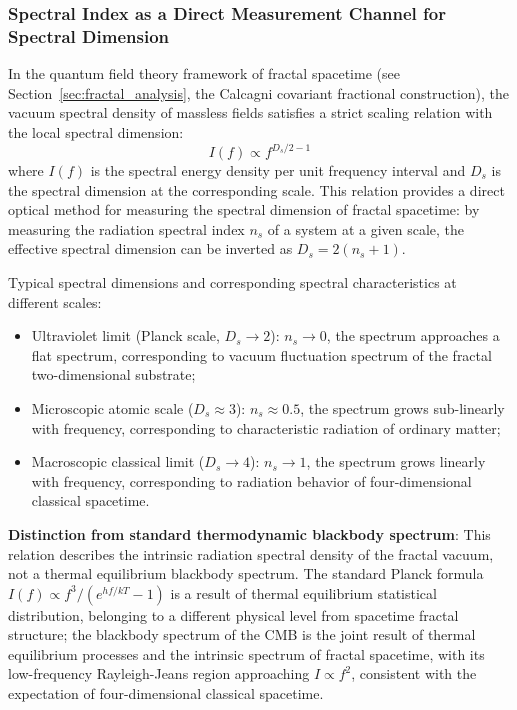 \documentclass[12pt,a4paper,twocolumn]{article}
\begin{document}
\subsubsection{Spectral Index as a Direct Measurement Channel for Spectral Dimension}
\label{subsec:spectral_index_measurement}
In the quantum field theory framework of fractal spacetime (see Section~\ref{sec:fractal_analysis}, the Calcagni covariant fractional construction), the vacuum spectral density of massless fields satisfies a strict scaling relation with the local spectral dimension:
\begin{equation}
I(f) \propto f^{D_s / 2 - 1}
\end{equation}
where $I(f)$ is the spectral energy density per unit frequency interval and $D_s$ is the spectral dimension at the corresponding scale. This relation provides a direct optical method for measuring the spectral dimension of fractal spacetime: by measuring the radiation spectral index $n_s$ of a system at a given scale, the effective spectral dimension can be inverted as $D_s = 2(n_s + 1)$.

Typical spectral dimensions and corresponding spectral characteristics at different scales:
\begin{itemize}
\item Ultraviolet limit (Planck scale, $D_s \to 2$): $n_s \to 0$, the spectrum approaches a flat spectrum, corresponding to vacuum fluctuation spectrum of the fractal two-dimensional substrate;
\item Microscopic atomic scale ($D_s \approx 3$): $n_s \approx 0.5$, the spectrum grows sub-linearly with frequency, corresponding to characteristic radiation of ordinary matter;
\item Macroscopic classical limit ($D_s \to 4$): $n_s \to 1$, the spectrum grows linearly with frequency, corresponding to radiation behavior of four-dimensional classical spacetime.
\end{itemize}

\textbf{Distinction from standard thermodynamic blackbody spectrum}: This relation describes the intrinsic radiation spectral density of the fractal vacuum, not a thermal equilibrium blackbody spectrum. The standard Planck formula $I(f) \propto f^3/(e^{hf/kT}-1)$ is a result of thermal equilibrium statistical distribution, belonging to a different physical level from spacetime fractal structure; the blackbody spectrum of the CMB is the joint result of thermal equilibrium processes and the intrinsic spectrum of fractal spacetime, with its low-frequency Rayleigh-Jeans region approaching $I\propto f^2$, consistent with the expectation of four-dimensional classical spacetime.
\end{document}
